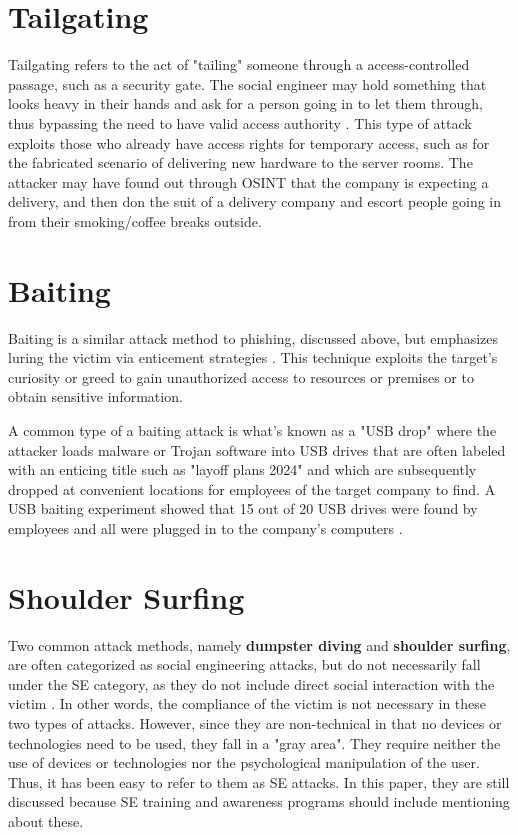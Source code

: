 \section{Tailgating}

Tailgating refers to the act of "tailing" someone through a access-controlled passage, such as a security gate. The social engineer may hold something that looks heavy in their hands and ask for a person going in to let them through, thus bypassing the need to have valid access authority \citep{conteh_cybersecurityrisks_2016}. This type of attack exploits those who already have access rights for temporary access, such as for the fabricated scenario of delivering new hardware to the server rooms. The attacker may have found out through OSINT that the company is expecting a delivery, and then don the suit of a delivery company and escort people going in from their smoking/coffee breaks outside.

\section{Baiting}

Baiting is a similar attack method to phishing, discussed above, but emphasizes luring the victim via enticement strategies \citep{conteh_cybersecurityrisks_2016}. This technique exploits the target's curiosity or greed to gain unauthorized access to resources or premises or to obtain sensitive information.

A common type of a baiting attack is what's known as a "USB drop" where the attacker loads malware or Trojan software into USB drives that are often labeled with an enticing title such as "layoff plans 2024" and which are subsequently dropped at convenient locations for employees of the target company to find. A USB baiting experiment showed that 15 out of 20 USB drives were found by employees and all were plugged in to the company's computers \citep{}.


\section{Shoulder Surfing}

Two common attack methods, namely \textbf{dumpster diving} and \textbf{shoulder surfing}, are often categorized as social engineering attacks, but do not necessarily fall under the SE category, as they do not include direct social interaction with the victim \citep{wang_defining_2020}. In other words, the compliance of the victim is not necessary in these two types of attacks. However, since they are non-technical in that no devices or technologies need to be used, they fall in a "gray area". They require neither the use of devices or technologies nor the psychological manipulation of the user. Thus, it has been easy to refer to them as SE attacks. In this paper, they are still discussed because SE training and awareness programs should include mentioning about these.

